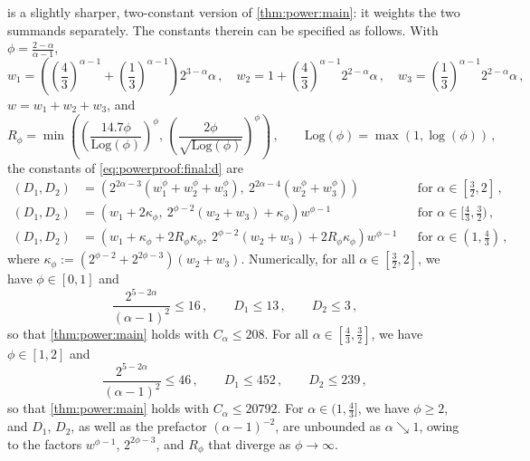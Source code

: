 \documentclass{article}
\newcommand{\lb}{\left(} %
\newcommand{\rb}{\right)} %
\newcommand{\br}[1]{\lb #1 \rb} %
\newcommand{\brOf}[1]{\!\br{#1}} %
\newcommand{\eqcm}{\,,} %
\begin{document}
\begin{remark}\label{rem:power:consts}
     is a slightly sharper, two-constant version of \cref{thm:power:main}: it weights the two summands separately. The constants therein can be specified as follows. With $\phi = \frac{2-\alpha}{\alpha-1}$,
    \begin{equation}
        w_1 = \br{\br{\frac43}^{\alpha-1}  + \br{\frac13}^{\alpha-1}} 2^{3-\alpha} \alpha
        \eqcm\quad
        w_2 = 1 + \br{\frac43}^{\alpha-1} 2^{2-\alpha} \alpha
        \eqcm\quad
        w_3 = \br{\frac13}^{\alpha-1} 2^{2-\alpha} \alpha
        \eqcm
    \end{equation}
    $w = w_1+w_2+w_3$, and
    \begin{equation}
        R_\phi = \min\brOf{\br{\frac{14.7 \phi}{\mathrm{Log}(\phi)}}^{\phi},\, \br{\frac{2\phi}{\sqrt{\mathrm{Log}(\phi)}}}^{\phi}}
        \eqcm
        \qquad 
        \mathrm{Log}(\phi) = \max(1, \log(\phi))
        \eqcm
    \end{equation}
    the constants of \eqref{eq:powerproof:final:d} are
    \begin{align}
        \br{D_1, D_2}
        &=
        \br{2^{2\alpha-3}\br{w_1^{\phi}+w_2^{\phi}+w_3^{\phi}},\ 
            2^{2\alpha-4}\br{w_2^{\phi}+w_3^{\phi}}}
        && \text{for } \alpha \in [\tfrac32, 2]
        \eqcm\\
        \br{D_1, D_2}
        &=
        \br{w_1 + 2 \kappa_\phi,\ 2^{\phi-2}\br{w_2+w_3} + \kappa_\phi} w^{\phi-1}
        && \text{for } \alpha \in [\tfrac43, \tfrac32)
        \eqcm\\
        \br{D_1, D_2}
        &=
        \br{w_1 + \kappa_\phi + 2R_\phi\kappa_\phi,\ 2^{\phi-2}\br{w_2+w_3} + 2R_\phi\kappa_\phi} w^{\phi-1}
        && \text{for } \alpha \in (1, \tfrac43)
        \eqcm
    \end{align}
    where $\kappa_\phi := \br{2^{\phi-2}+2^{2\phi-3}}\br{w_2+w_3}$.
    Numerically, for all $\alpha \in [\frac32, 2]$, we have $\phi \in [0, 1]$ and
    \begin{equation}
        \frac{2^{5-2\alpha}}{(\alpha-1)^2} \leq 16
        \eqcm\qquad
        D_1 \leq 13
        \eqcm\qquad
        D_2 \leq 3
        \eqcm
    \end{equation}
    so that \cref{thm:power:main} holds with $C_\alpha \leq 208$.
    For all $\alpha \in [\frac43, \frac32]$, we have $\phi \in [1, 2]$ and
    \begin{equation}
        \frac{2^{5-2\alpha}}{(\alpha-1)^2} \leq 46
        \eqcm\qquad
        D_1 \leq 452
        \eqcm\qquad
        D_2 \leq 239
        \eqcm
    \end{equation}
    so that \cref{thm:power:main} holds with $C_\alpha \leq 20792$.
    For $\alpha \in (1, \frac43]$, we have $\phi \geq 2$, and $D_1$, $D_2$, as well as the prefactor $(\alpha-1)^{-2}$, are unbounded as $\alpha \searrow 1$, owing to the factors $w^{\phi-1}$, $2^{2\phi-3}$, and $R_\phi$ that diverge as $\phi \to \infty$.
    

\end{remark}
\end{document}
